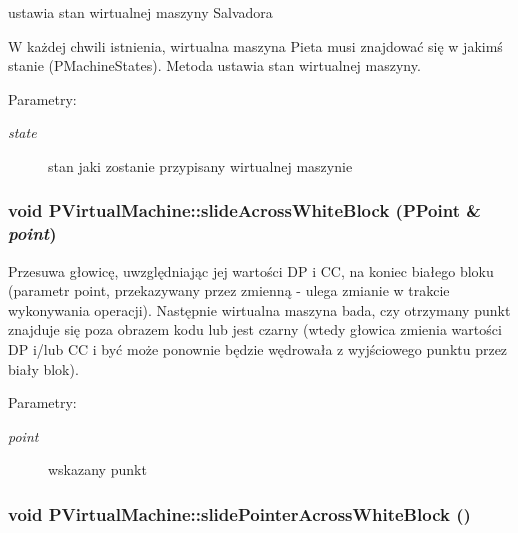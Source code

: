 ustawia stan wirtualnej maszyny Salvadora 

W każdej chwili istnienia, wirtualna maszyna Pieta musi znajdować się w jakimś stanie (PMachineStates). Metoda ustawia stan wirtualnej maszyny. \begin{Desc}
\item[Parametry:]
\begin{description}
\item[{\em state}]stan jaki zostanie przypisany wirtualnej maszynie \end{description}
\end{Desc}
\hypertarget{classPVirtualMachine_4b2ebb998393324c5240dc48fdb14f3a}{
\subsubsection[{slideAcrossWhiteBlock}]{\setlength{\rightskip}{0pt plus 5cm}void PVirtualMachine::slideAcrossWhiteBlock (PPoint \& {\em point})}}
\label{classPVirtualMachine_4b2ebb998393324c5240dc48fdb14f3a}


Przesuwa głowicę, uwzględniając jej wartości DP i CC, na koniec białego bloku (parametr point, przekazywany przez zmienną - ulega zmianie w trakcie wykonywania operacji). Następnie wirtualna maszyna bada, czy otrzymany punkt znajduje się poza obrazem kodu lub jest czarny (wtedy głowica zmienia wartości DP i/lub CC i być może ponownie będzie wędrowała z wyjściowego punktu przez biały blok). \begin{Desc}
\item[Parametry:]
\begin{description}
\item[{\em point}]wskazany punkt \end{description}
\end{Desc}
\hypertarget{classPVirtualMachine_e37d4dfa512c3dd97b9958f013ffb7b3}{
\subsubsection[{slidePointerAcrossWhiteBlock}]{\setlength{\rightskip}{0pt plus 5cm}void PVirtualMachine::slidePointerAcrossWhiteBlock ()}}
\label{classPVirtualMachine_e37d4dfa512c3dd97b9958f013ffb7b3}


